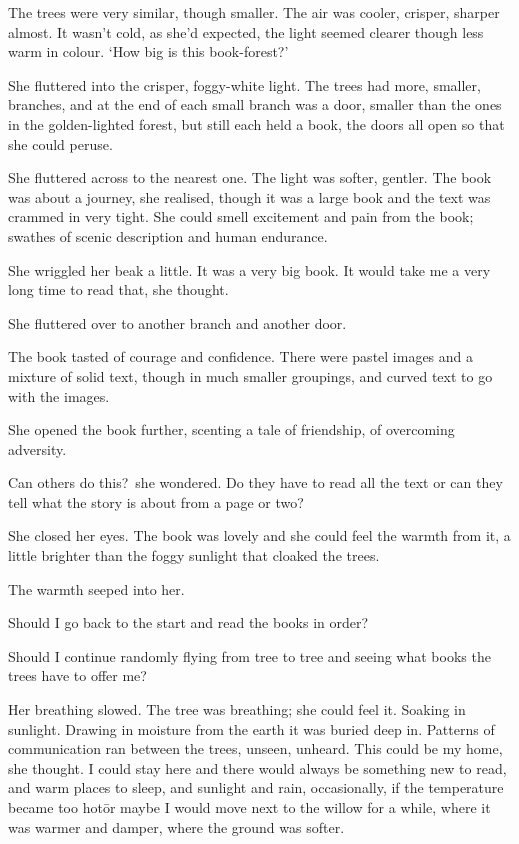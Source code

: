 The trees were very similar, though smaller. The air was cooler,
crisper, sharper almost. It wasn't cold, as she'd expected, the light
seemed clearer though less warm in colour.  `How big is this
book-forest?'

She fluttered into the crisper, foggy-white light. The trees had more,
smaller, branches, and at the end of each small branch was a door,
smaller than the ones in the golden-lighted forest, but still each
held a book, the doors all open so that she could peruse.

She fluttered across to the nearest one. The light was softer,
gentler. The book was about a journey, she realised, though it was a
large book and the text was crammed in very tight. She could smell
excitement and pain from the book; swathes of scenic description and
human endurance.

She wriggled her beak a little. It was a very big book. It would take
me a very long time to read that, she thought.

She fluttered over to another branch and another door.

The book tasted of courage and confidence. There were pastel images
and a mixture of solid text, though in much smaller groupings, and
curved text to go with the images.

She opened the book further, scenting a tale of friendship, of
overcoming adversity.

Can others do this?~she wondered. Do they have to read all the text or
can they tell what the story is about from a page or two?

She closed her eyes. The book was lovely and she could feel the warmth
from it, a little brighter than the foggy sunlight that cloaked the
trees.

The warmth seeped into her.

Should I go back to the start and read the books in order?

Should I continue randomly flying from tree to tree and seeing what
books the trees have to offer me?

Her breathing slowed. The tree was breathing; she could feel it. Soaking
in sunlight. Drawing in moisture from the earth it was buried deep
in. Patterns of communication ran between the trees, unseen,
unheard. This could be my home, she thought. I could stay here and
there would always be something new to read, and warm places to sleep,
and sunlight and rain, occasionally, if the temperature became too
hot\=or maybe I would move next to the willow for a while, where it
was warmer and damper, where the ground was softer.

